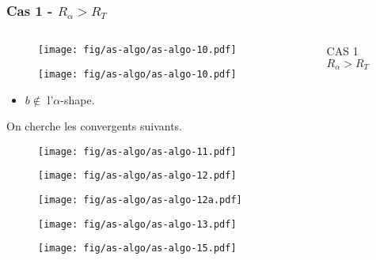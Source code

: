 \documentclass{beamer}
\begin{document}
\begin{frame}
\frametitle{Cas 1 - $R_{\alpha} > R_T$}
  
  \begin{columns}[t]
   \begin{column}{7cm}
      {
        \begin{figure}[H]
          \centering
          \texttt{[image: fig/as-algo/as-algo-10.pdf]}
      \end{figure}
      }
      {
        \begin{figure}[H]
          \centering
          \texttt{[image: fig/as-algo/as-algo-10.pdf]}
       \end{figure}
      }
      {
          \begin{block}{}
            \begin{itemize}
              \item $b \notin$ l'$\alpha$-shape.
            \end{itemize} 
          \alert{On cherche les convergents suivants.}
        \end{block}
      }   
      {
        \begin{figure}[H]
          \centering
          \texttt{[image: fig/as-algo/as-algo-11.pdf]}
      \end{figure}
      }
      {
        \begin{figure}[H]
          \centering
          \texttt{[image: fig/as-algo/as-algo-12.pdf]}
      \end{figure}
      }
      {
        \begin{figure}[h!]
          \centering
          \texttt{[image: fig/as-algo/as-algo-12a.pdf]}
      \end{figure}
      }
      {
        \begin{figure}[h!]
          \centering
          \texttt{[image: fig/as-algo/as-algo-13.pdf]}
      \end{figure}
      }
      {
        \begin{figure}[h!]
          \centering
          \texttt{[image: fig/as-algo/as-algo-15.pdf]}
      \end{figure}
      }
   \end{column}
    \begin{column}{3cm}
      \begin{block}{}
        {
          \alert{CAS 1}\\
          \alert{$R_{\alpha} > R_T$}
          
}
\end{block}
\end{column}
\end{columns}
\end{frame}
\end{document}
